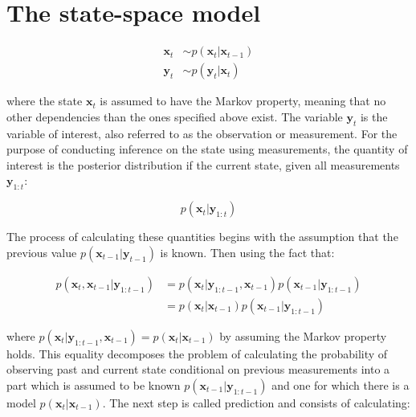 \documentclass[
]{article}
\begin{document}
\hypertarget{the-state-space-model}{%
\section{The state-space model}\label{the-state-space-model}}

\begin{equation*} 
    \begin{aligned}
        \textbf{x}_t &\sim p(\textbf{x}_t|\textbf{x}_{t-1}) \\
        \textbf{y}_t &\sim p(\textbf{y}_t|\textbf{x}_t)
    \end{aligned}    
\end{equation*}

where the state \(\textbf{x}_t\) is assumed to have the Markov property,
meaning that no other dependencies than the ones specified above exist.
The variable \(\textbf{y}_t\) is the variable of interest, also referred
to as the observation or measurement. For the purpose of conducting
inference on the state using measurements, the quantity of interest is
the posterior distribution if the current state, given all measurements
\(\textbf{y}_{1:t}\):

\begin{equation*} 
    p(\textbf{x}_t|\textbf{y}_{1:t}) 
\end{equation*}

The process of calculating these quantities begins with the assumption
that the previous value \(p(\textbf{x}_{t-1}|\textbf{y}_{t-1})\) is
known. Then using the fact that:

\begin{equation*} 
    \begin{aligned}
        p(\textbf{x}_{t}, \textbf{x}_{t-1}|\textbf{y}_{1:t-1}) &= p(\textbf{x}_{t}|\textbf{y}_{1:t-1}, \textbf{x}_{t-1}) p(\textbf{x}_{t-1} |\textbf{y}_{1:t-1}) \\
                                                               &= p(\textbf{x}_{t}|\textbf{x}_{t-1}) p(\textbf{x}_{t-1} |\textbf{y}_{1:t-1})                               
    \end{aligned}
\end{equation*}

where
\(p(\textbf{x}_{t}|\textbf{y}_{1:t-1}, \textbf{x}_{t-1}) = p(\textbf{x}_{t}|\textbf{x}_{t-1})\)
by assuming the Markov property holds. This equality decomposes the
problem of calculating the probability of observing past and current
state conditional on previous measurements into a part which is assumed
to be known \(p(\textbf{x}_{t-1} |\textbf{y}_{1:t-1})\) and one for
which there is a model \(p(\textbf{x}_{t}|\textbf{x}_{t-1})\). The next
step is called prediction and consists of calculating:
\end{document}
